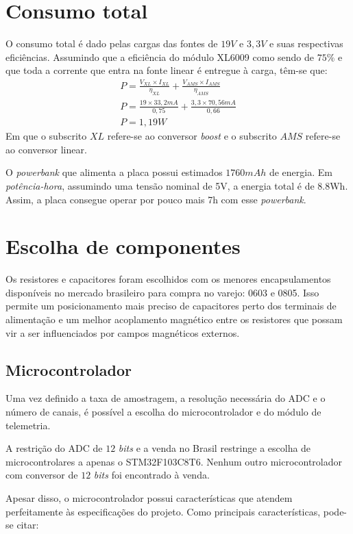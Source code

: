 \documentclass[
	12pt,				%
	openright,			%
	twoside,			%
	a4paper,			%
	english,			%
	french,				%
	spanish,			%
	brazil,				%
	]{abntex2}
\begin{document}
	\section{Consumo total}
		O consumo total é dado pelas cargas das fontes de $19V$ e $3,3V$ e
		suas respectivas eficiências. Assumindo que a eficiência do
		módulo XL6009 como sendo de $75\%$ e que toda a corrente que entra
		na fonte linear é entregue à carga, têm-se que:
		\begin{gather*}
			P = \frac{V_{XL}\times I_{XL}}{\eta _{XL}} + \frac{V_{AMS}\times I_{AMS}}{\eta _{AMS}}\\
			P = \frac{19\times 33,2mA}{0,75} + \frac{3,3\times 70,56mA}{0,66}\\
			P = 1,19W
		\end{gather*}
		Em que o subscrito $XL$ refere-se ao conversor \textit{boost} e
		o subscrito $AMS$ refere-se ao conversor linear.

		O \textit{powerbank} que alimenta a placa possui estimados $1760mAh$ de
		energia. Em \textit{potência-hora}, assumindo uma tensão nominal
		de 5V, a energia total é de 8.8Wh. Assim, a placa consegue operar
		por pouco mais 7h com esse \textit{powerbank}.

	\section{Escolha de componentes}
		Os resistores e capacitores foram escolhidos com os menores
		encapsulamentos disponíveis no mercado brasileiro para compra no varejo:
		0603 e 0805. Isso permite um posicionamento mais preciso de capacitores
		perto dos terminais de alimentação e um melhor acoplamento magnético
		entre os resistores que possam vir a ser influenciados por campos
		magnéticos externos.
		
		\subsection{Microcontrolador}
			Uma vez definido a taxa de amostragem, a resolução necessária do
			ADC e o número de canais, é possível a escolha do
			microcontrolador e do módulo de telemetria.

			A restrição do ADC de $12$ \textit{bits} e a venda no Brasil
			restringe a escolha de microcontrolares a apenas o
			STM32F103C8T6.\cite{stm} Nenhum outro microcontrolador com conversor de
			$12$ \textit{bits} foi encontrado à venda.

			Apesar disso, o microcontrolador possui características que
			atendem perfeitamente às especificações do projeto. Como
			principais características, pode-se citar:
\end{document}
